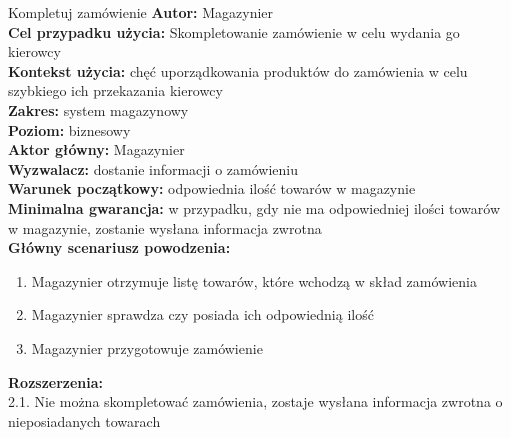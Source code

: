 \begin{usecase}{Kompletuj zamówienie}
	\textbf{Autor:} Magazynier\\
	\textbf{Cel przypadku użycia:} Skompletowanie zamówienie w celu wydania go kierowcy \\
	\textbf{Kontekst użycia:} chęć uporządkowania produktów do zamówienia w celu szybkiego ich przekazania kierowcy \\
	\textbf{Zakres:} system magazynowy \\
	\textbf{Poziom:} biznesowy \\
	\textbf{Aktor główny:} Magazynier \\
	\textbf{Wyzwalacz:} dostanie informacji o zamówieniu \\
	\textbf{Warunek początkowy:} odpowiednia ilość towarów w magazynie \\
	\textbf{Minimalna gwarancja:} w przypadku, gdy nie ma odpowiedniej ilości towarów w magazynie, zostanie wysłana informacja zwrotna  \\
	\textbf{Główny scenariusz powodzenia:} 
		\begin{enumerate}
			\item Magazynier otrzymuje listę towarów, które wchodzą w skład zamówienia
			\item Magazynier sprawdza czy posiada ich odpowiednią ilość
			\item Magazynier przygotowuje zamówienie
		\end{enumerate}
	\textbf{Rozszerzenia:} \\
	2.1. Nie można skompletować zamówienia, zostaje wysłana informacja zwrotna o nieposiadanych towarach\\
\end{usecase}

